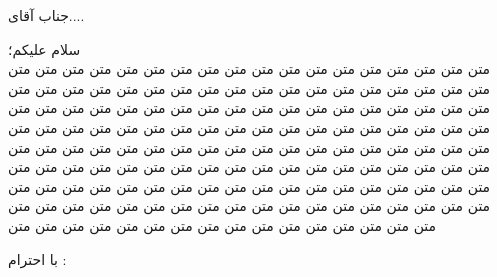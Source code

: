 \documentclass{letter}
\begin{document}
	
	\begin{letter}{}
		\opening{جناب آقای....}
		
		سلام علیکم؛\\
		متن متن متن متن متن متن متن متن متن متن متن متن متن متن متن متن متن متن متن متن متن متن متن متن متن متن متن متن متن متن متن متن متن متن متن متن متن متن متن متن متن متن متن متن متن متن متن متن متن متن متن متن متن متن متن متن متن متن متن متن متن متن متن متن متن متن متن متن متن متن متن متن متن متن متن متن متن متن متن متن متن متن متن متن متن متن متن متن متن متن متن متن متن متن متن متن متن متن متن متن متن متن متن متن متن متن متن متن متن متن متن متن متن متن متن متن متن متن متن متن متن متن متن متن متن متن متن متن متن متن متن متن متن متن متن متن متن متن متن متن متن متن متن متن متن متن متن متن متن متن متن متن متن متن متن متن متن متن متن متن 
		
		
		\closing{با احترام :}
		
	\end{letter}
\end{document}
